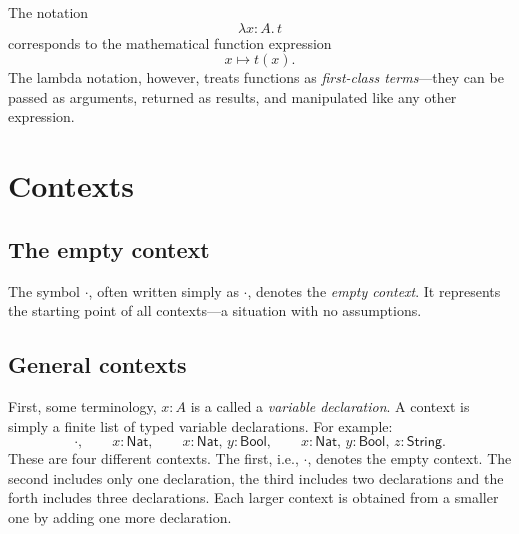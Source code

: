 \documentclass{article}
\newcommand{\Type}{\ensuremath{\mathsf{Type}}}
\newcommand{\Nat}{\mathsf{Nat}}
\newcommand{\Bool}{\mathsf{Bool}}
\newcommand{\String}{\mathsf{String}}
\newcommand{\emptyctx}{\cdot}              %
\newcommand{\ctx}{\mathsf{ctx}}            %
\begin{document}
The notation
\[
\lambda x\!:\!A.\,t
\]
corresponds to the mathematical function expression
\[
x \mapsto t(x).
\]
The lambda notation, however, treats functions as \emph{first-class terms}—they can be
passed as arguments, returned as results, and manipulated like any other expression.




\section{Contexts}

\subsection*{The empty context}
The symbol \(\emptyctx\), often written simply as \(\cdot\), denotes the \emph{empty context}.
It represents the starting point of all contexts---a situation with no assumptions.

\subsection*{General contexts}

First, some terminology, \(x : A\) is a called a \emph{variable declaration}.
A context is simply a finite list of typed variable declarations.  
For example:
\[
\emptyctx, \qquad
x : \Nat, \qquad
x : \Nat,\, y : \Bool, \qquad
x : \Nat,\, y : \Bool,\, z : \String.
\]
These are four different contexts. The first, i.e., $\cdot$, denotes the empty context. The second includes only one declaration, the third includes two declarations and the forth includes three declarations. Each larger context is obtained from a smaller one by adding one more declaration.
\end{document}

